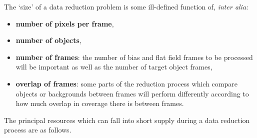 \documentclass[twoside,11pt]{article}
\begin{document}
The `size' of a data reduction problem is some ill-defined
function of, {\it inter alia:}

\begin{itemize}

  \item \textbf{number of pixels per frame},

  \item \textbf{number of objects},

  \item \textbf{number of frames}:
   the number of bias and flat field frames to be processed will be important
   as well as the number of target object frames,

  \item \textbf{overlap of frames}:
   some parts of the reduction process which compare objects or
   backgrounds between frames will perform differently according
   to how much overlap in coverage there is between frames.

\end{itemize}

The principal resources which can fall into short supply during
a data reduction process are as follows.
\end{document}
